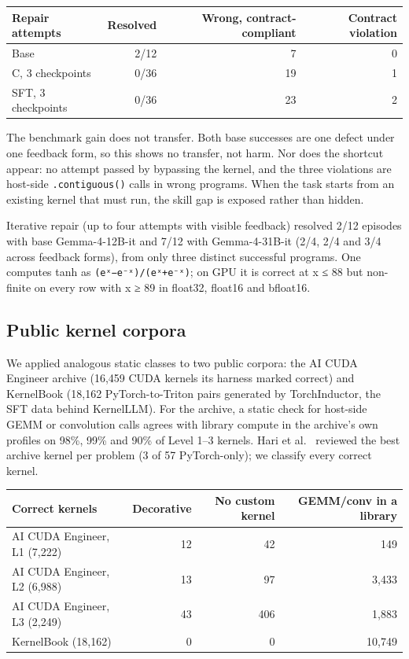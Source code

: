 \documentclass[11pt]{article}
\begin{document}
\begin{center}\small
\begin{tabular}{@{}
  l
  r
  r
  r@{}}
\toprule\noalign{}
Repair attempts & Resolved & Wrong, contract-compliant & Contract violation \\
\midrule\noalign{}
Base & 2/12 & 7 & 0 \\
C, 3 checkpoints & 0/36 & 19 & 1 \\
SFT, 3 checkpoints & 0/36 & 23 & 2 \\
\bottomrule
\end{tabular}
\end{center}

The benchmark gain does not transfer. Both base successes are one defect under one
feedback form, so this shows no transfer, not harm. Nor does the shortcut appear: no
attempt passed by bypassing the kernel, and the three violations are host-side
\texttt{.\allowbreak{}contiguous()} calls in wrong programs. When the task starts from an existing kernel
that must run, the skill gap is exposed rather than hidden.

Iterative repair (up to four attempts with visible feedback) resolved 2/12 episodes with
base Gemma-4-12B-it and 7/12 with Gemma-4-31B-it (2/4, 2/4 and 3/4 across feedback
forms), from only three distinct successful programs. One computes tanh as
\texttt{(eˣ−e⁻ˣ)/(eˣ+e⁻ˣ)}; on GPU it is correct at \textbar x\textbar{} ≤ 88 but non-finite on every row with
\textbar x\textbar{} ≥ 89 in float32, float16 and bfloat16.

\subsection{Public kernel corpora}\label{public-kernel-corpora}

We applied analogous static classes to two public
corpora: the AI CUDA Engineer archive \cite{r17} (16,459 CUDA kernels its harness marked
correct) and KernelBook \cite{r18} (18,162 PyTorch-to-Triton pairs generated by TorchInductor,
the SFT data behind KernelLLM). For the archive, a static check for host-side GEMM or
convolution calls agrees with library compute in the archive's own profiles on 98\%,
99\% and 90\% of Level 1--3 kernels. Hari et al.~\cite{r16} reviewed the best archive kernel per
problem (3 of 57 PyTorch-only); we classify every correct kernel.

\begin{center}\small
\begin{tabular}{@{}
  l
  r
  r
  r@{}}
\toprule\noalign{}
Correct kernels & Decorative & No custom kernel & GEMM/conv in a library \\
\midrule\noalign{}
AI CUDA Engineer, L1 (7,222) & 12 & 42 & 149 \\
AI CUDA Engineer, L2 (6,988) & 13 & 97 & 3,433 \\
AI CUDA Engineer, L3 (2,249) & 43 & 406 & 1,883 \\
KernelBook (18,162) & 0 & 0 & 10,749 \\
\bottomrule
\end{tabular}
\end{center}
\end{document}
